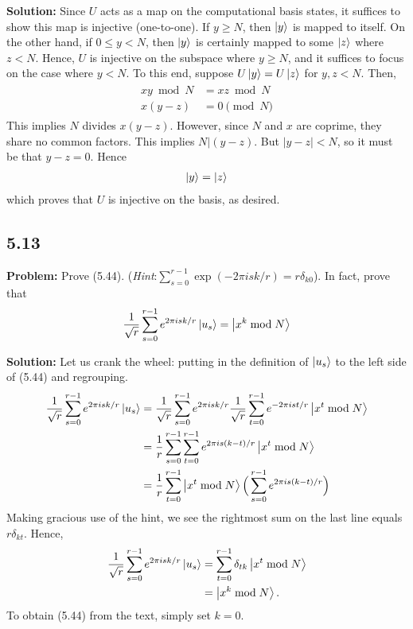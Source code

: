 \documentclass{article}
\begin{document}
\textbf{Solution:} Since $U$ acts as a map on the computational basis states, it suffices to show this map is injective (one-to-one). If $y\geq N$, then $\ket{y}$ is mapped to itself. On the other hand, if $0\leq y < N$, then $\ket{y}$ is certainly mapped to some $\ket{z}$ where $z< N$. Hence, $U$ is injective on the subspace where $y\geq N$, and it suffices to focus on the case where $y< N$. To this end, suppose $U\ket{y} = U\ket{z}$ for $y,z < N$. Then,
\begin{align}
\begin{aligned}
    xy\bmod{N} &= xz\bmod{N} \\
    x(y-z) &= 0 \pmod{N}
\end{aligned}
\end{align}
This implies $N$ divides $x(y-z)$. However, since $N$ and $x$ are coprime, they share no common factors. This implies $N|(y-z)$. But $|y-z| < N$, so it must be that $y-z = 0$. Hence
\begin{align}
    \ket{y} = \ket{z}
\end{align}
which proves that $U$ is injective on the basis, as desired.

\subsection*{5.13}
\textbf{Problem:} Prove (5.44). (\emph{Hint}:$\sum_{s=0}^{r-1}\exp(-2\pi i sk/r)=r\delta_{k0}$). In fact, prove that
\begin{align}
    \frac{1}{\sqrt{r}}\sum_{s=0}^{r-1}e^{2\pi isk/r}\ket{u_s} = \ket{x^k\bmod N}
\end{align}

\textbf{Solution:} Let us crank the wheel: putting in the definition of $\ket{u_s}$ to the left side of (5.44) and regrouping.
\begin{align}
    \frac{1}{\sqrt{r}}\sum_{s=0}^{r-1}e^{2\pi isk/r}\ket{u_s} &= \frac{1}{\sqrt{r}}\sum_{s=0}^{r-1}e^{2\pi isk/r} \frac{1}{\sqrt{r}}\sum_{t=0}^{r-1}e^{-2\pi ist/r}\ket{x^t\bmod N} \\
    &= \frac{1}{r}\sum_{s=0}^{r-1}\sum_{t=0}^{r-1}e^{2\pi is(k-t)/r}\ket{x^t\bmod N} \\
    &=\frac{1}{r}\sum_{t=0}^{r-1}\ket{x^t\bmod N}\Big(\sum_{s=0}^{r-1}e^{2\pi is(k-t)/r}\Big)
\end{align}
Making gracious use of the hint, we see the rightmost sum on the last line equals $r\delta_{kt}$. Hence,
\begin{align}
    \frac{1}{\sqrt{r}}\sum_{s=0}^{r-1}e^{2\pi isk/r}\ket{u_s} &= \sum_{t=0}^{r-1}\delta_{tk}\ket{x^t \bmod N} \\
    &= \ket{x^k \bmod N}.
\end{align}
To obtain (5.44) from the text, simply set $k=0$.
\end{document}
